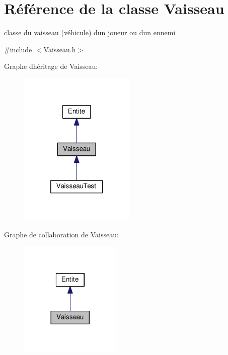 \hypertarget{class_vaisseau}{}\section{Référence de la classe Vaisseau}
\label{class_vaisseau}


classe du vaisseau (véhicule) d\textquotesingle{}un joueur ou d\textquotesingle{}un ennemi  




{\ttfamily \#include $<$Vaisseau.\+h$>$}



Graphe d\textquotesingle{}héritage de Vaisseau\+:
\nopagebreak
\begin{figure}[H]
\begin{center}
\leavevmode
\includegraphics[width=157pt]{class_vaisseau__inherit__graph}
\end{center}
\end{figure}


Graphe de collaboration de Vaisseau\+:
\nopagebreak
\begin{figure}[H]
\begin{center}
\leavevmode
\includegraphics[width=137pt]{class_vaisseau__coll__graph}
\end{center}
\end{figure}
